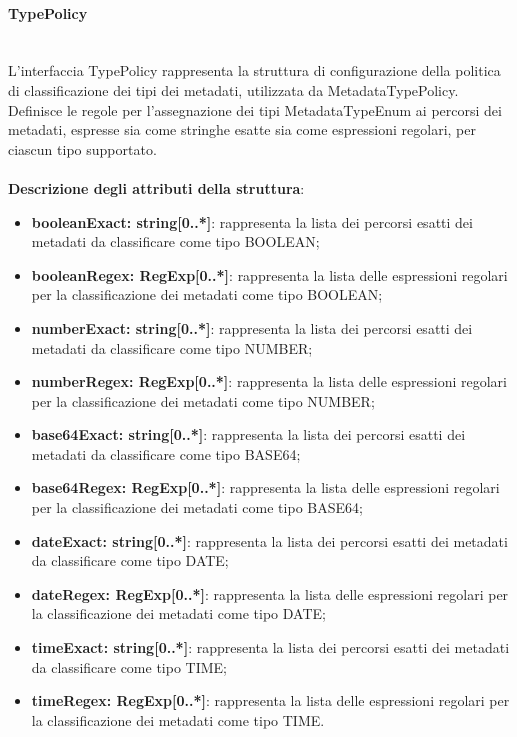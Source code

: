 \documentclass[a4paper,12pt]{article}
\begin{document}
{                \paragraph{TypePolicy}\label{par:TypePolicy}\mbox{}\\
                L'interfaccia TypePolicy rappresenta la struttura di configurazione della politica di classificazione dei tipi dei metadati, utilizzata da MetadataTypePolicy. Definisce le regole per l'assegnazione dei tipi MetadataTypeEnum ai percorsi dei metadati, espresse sia come stringhe esatte sia come espressioni regolari, per ciascun tipo supportato.\\
                \\
                \textbf{Descrizione degli attributi della struttura}:
                \begin{itemize}
                    \item \textbf{booleanExact: string[0..*]}: rappresenta la lista dei percorsi esatti dei metadati da classificare come tipo BOOLEAN;
                    \item \textbf{booleanRegex: RegExp[0..*]}: rappresenta la lista delle espressioni regolari per la classificazione dei metadati come tipo BOOLEAN;
                    \item \textbf{numberExact: string[0..*]}: rappresenta la lista dei percorsi esatti dei metadati da classificare come tipo NUMBER;
                    \item \textbf{numberRegex: RegExp[0..*]}: rappresenta la lista delle espressioni regolari per la classificazione dei metadati come tipo NUMBER;
                    \item \textbf{base64Exact: string[0..*]}: rappresenta la lista dei percorsi esatti dei metadati da classificare come tipo BASE64;
                    \item \textbf{base64Regex: RegExp[0..*]}: rappresenta la lista delle espressioni regolari per la classificazione dei metadati come tipo BASE64;
                    \item \textbf{dateExact: string[0..*]}: rappresenta la lista dei percorsi esatti dei metadati da classificare come tipo DATE;
                    \item \textbf{dateRegex: RegExp[0..*]}: rappresenta la lista delle espressioni regolari per la classificazione dei metadati come tipo DATE;
                    \item \textbf{timeExact: string[0..*]}: rappresenta la lista dei percorsi esatti dei metadati da classificare come tipo TIME;
                    \item \textbf{timeRegex: RegExp[0..*]}: rappresenta la lista delle espressioni regolari per la classificazione dei metadati come tipo TIME.
                \end{itemize}
            }
            
\end{document}
